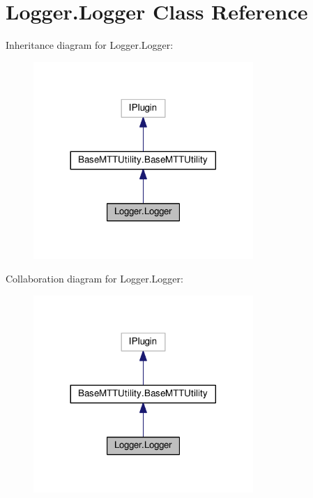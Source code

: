 \hypertarget{class_logger_1_1_logger}{\section{Logger.\-Logger Class Reference}
\label{class_logger_1_1_logger}
}


Inheritance diagram for Logger.\-Logger\-:
\nopagebreak
\begin{figure}[H]
\begin{center}
\leavevmode
\includegraphics[width=236pt]{class_logger_1_1_logger__inherit__graph}
\end{center}
\end{figure}


Collaboration diagram for Logger.\-Logger\-:
\nopagebreak
\begin{figure}[H]
\begin{center}
\leavevmode
\includegraphics[width=236pt]{class_logger_1_1_logger__coll__graph}
\end{center}
\end{figure}
